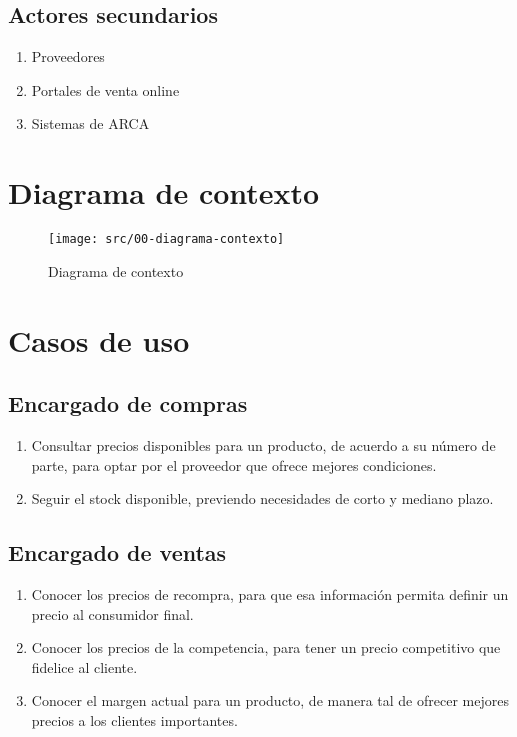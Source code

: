 \documentclass[11pt]{article}
\begin{document}
\subsection*{Actores secundarios}
\begin{enumerate}
	\item Proveedores 
	\item Portales de venta online 
	\item Sistemas de ARCA
\end{enumerate}

\section{Diagrama de contexto}

\begin{figure}[ht]
	\vspace{20pt}
	\centering
	\vspace{15pt}
	\texttt{[image: src/00-diagrama-contexto]}
	\caption{Diagrama de contexto}
	\vspace{15pt}
\end{figure}

\section{Casos de uso}

\subsection*{Encargado de compras}
\begin{enumerate}
	\item Consultar precios disponibles para un producto, 
	de acuerdo a su número de parte, 
	para optar por el proveedor que ofrece mejores condiciones.
	\item Seguir el stock disponible,
	previendo necesidades de corto y mediano plazo.
\end{enumerate}

\subsection*{Encargado de ventas}
\begin{enumerate}
	\item Conocer los precios de recompra,
	para que esa información permita definir un precio al consumidor final.
	\item Conocer los precios de la competencia,
	para tener un precio competitivo que fidelice al cliente.
	\item Conocer el margen actual para un producto,
	de manera tal de ofrecer mejores precios a los clientes importantes.
\end{enumerate}
\end{document}
